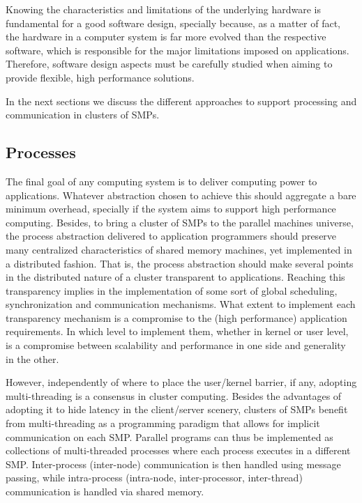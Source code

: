 	Knowing the characteristics and limitations of the underlying hardware is fundamental for a good software design, specially because, as a matter of fact, the hardware in a computer system is far more evolved than the respective software, which is responsible for the major limitations imposed on applications. Therefore, software design aspects must be carefully studied when aiming to provide flexible, high performance solutions.

	In the next sections we discuss the different approaches to support processing and communication in clusters of SMPs.
	

\subsection{\label{soft_proc}Processes}

	The final goal of any computing system is to deliver computing power to applications. Whatever abstraction chosen to achieve this should aggregate a bare minimum overhead, specially if the system aims to support high performance computing. Besides, to bring a cluster of SMPs to the parallel machines universe, the process abstraction delivered to application programmers should preserve many centralized characteristics of shared memory machines, yet implemented in a distributed fashion. That is, the process abstraction should make several points in the distributed nature of a cluster transparent to applications. Reaching this transparency implies in the implementation of some sort of global scheduling, synchronization and communication mechanisms. What extent to implement each transparency mechanism is a compromise to the (high performance) application requirements. In which level to implement them, whether in kernel or user level, is a compromise between scalability and performance in one side and generality in the other.
	
	 However, independently of where to place the user/kernel barrier, if any, adopting multi-threading is a consensus in cluster computing. Besides the advantages of adopting it to hide latency in the client/server scenery, clusters of SMPs benefit from multi-threading as a programming paradigm that allows for implicit communication on each SMP. Parallel programs can thus be implemented as collections of multi-threaded processes where each process executes in a different SMP. Inter-process (inter-node) communication is then handled using message passing, while intra-process (intra-node, inter-processor, inter-thread) communication is handled via shared memory.
	 
